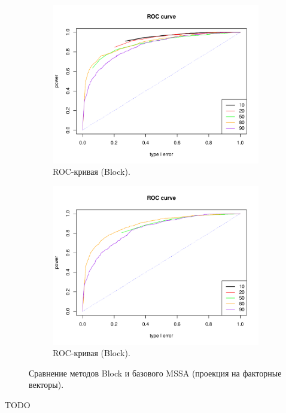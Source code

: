 \documentclass[specialist,
substylefile = spbu_report.rtx,
subf,href,colorlinks=true, 12pt]{disser}
\theoremstyle{definition}
\begin{document}
\begin{figure}
\begin{subfigure}[t]{0.45\textwidth}
			\centering
			\includegraphics[width=\textwidth]{roc_block_fa.pdf}
			\caption{ROC-кривая (Block).}
		\end{subfigure}\hspace{\fill}
		\begin{subfigure}[t]{0.45\textwidth}
			\centering
			\includegraphics[width=\textwidth]{roc_mssa_fa.pdf}
			\caption{ROC-кривая (Block).}
		\end{subfigure}
		\caption{Сравнение методов Block и базового MSSA (проекция на факторные векторы).}
		\label{fig:block_fa}
	\end{figure}
	\conclusion
	TODO
\end{document}
